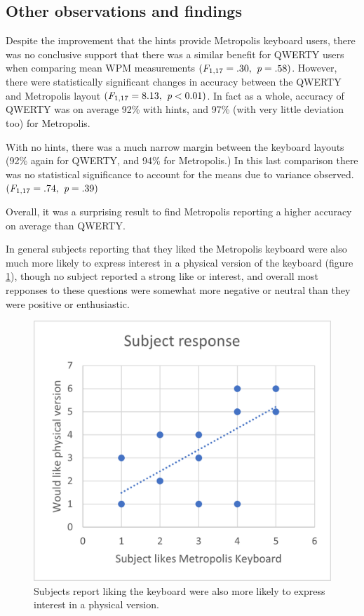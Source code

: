 \documentclass[english]{vgtc}
\begin{document}
\subsection{Other observations and findings}

Despite the improvement that the hints provide Metropolis keyboard users, there was no conclusive support that there was a
similar benefit for QWERTY users when comparing mean WPM measurements $(\emph{F}_{1,17} = .30, \emph{ p}=.58)$.  However,
there were statistically significant changes in accuracy between the QWERTY and Metropolis layout $(\emph{F}_{1,17} = 8.13, \emph{ p}<0.01)$.
In fact as a whole, accuracy of QWERTY was on average 92\% with hints, and 97\% (with very little deviation too) for Metropolis.

With no hints, there was a much narrow margin between the keyboard layouts (92\% again for QWERTY, and 94\% for Metropolis.)
In this last comparison there was no statistical significance to account for the means due to variance observed. $(\emph{F}_{1,17} = .74, \emph{ p}=.39)$ 

Overall, it was a surprising result to find Metropolis reporting a higher accuracy on average than QWERTY.

In general subjects reporting that they liked the Metropolis keyboard were also much more likely to express interest in 
a physical version of the keyboard (figure \ref{fig:interest}), though no subject reported a strong like or interest, and overall
most repponses to these questions were somewhat more negative or neutral than they were positive or enthusiastic.

\begin{figure}
  \centering
  \includegraphics[width=0.95\columnwidth]{subject-response.png}
  \caption{Subjects report liking the keyboard were also more likely to express interest in a physical version.}
  \label{fig:interest}
\end{figure}
\end{document}
